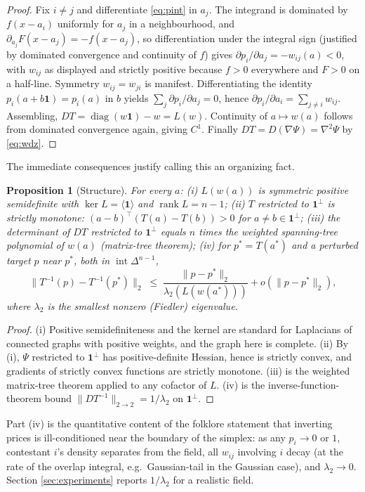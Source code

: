 \documentclass[11pt]{article}
\newtheorem{proposition}{Proposition}
\theoremstyle{definition}
\theoremstyle{remark}
\newcommand{\one}{\mathbf{1}}
\newcommand{\intsimplex}{\operatorname{int}\Delta^{n-1}}
\newcommand{\perpone}{\one^{\perp}}
\DeclareMathOperator{\diag}{diag}
\DeclareMathOperator{\rank}{rank}
\begin{document}
\begin{proof}
Fix $i \ne j$ and differentiate \eqref{eq:pint} in $a_j$.  The integrand is
dominated by $f(x-a_i)$ uniformly for $a_j$ in a neighbourhood, and
$\partial_{a_j} F(x-a_j) = -f(x-a_j)$, so differentiation under the integral
sign (justified by dominated convergence and continuity of $f$) gives
$\partial p_i / \partial a_j = -w_{ij}(a) < 0$, with $w_{ij}$ as displayed and
strictly positive because $f > 0$ everywhere and $F > 0$ on a half-line.
Symmetry $w_{ij} = w_{ji}$ is manifest.  Differentiating the identity
$p_i(a + b\one) = p_i(a)$ in $b$ yields
$\sum_j \partial p_i/\partial a_j = 0$, hence
$\partial p_i / \partial a_i = \sum_{j\ne i} w_{ij}$.  Assembling,
$DT = \diag(w\one) - w = L(w)$.  Continuity of $a \mapsto w(a)$ follows from
dominated convergence again, giving $C^1$.  Finally
$DT = D(\nabla\Psi) = \nabla^2\Psi$ by \eqref{eq:wdz}.
\end{proof}

The immediate consequences justify calling this an organizing fact.

\begin{proposition}[Structure]
\label{prop:structure}
For every $a$: (i) $L(w(a))$ is symmetric positive semidefinite with
$\ker L = \langle \one \rangle$ and $\rank L = n-1$; (ii) $T$ restricted to
$\perpone$ is strictly monotone:
$(a-b)^\top (T(a) - T(b)) > 0$ for $a \ne b \in \perpone$; (iii) the
determinant of $DT$ restricted to $\perpone$ equals $n$ times the weighted
spanning-tree polynomial of $w(a)$ (matrix-tree theorem); (iv) for
$p^* = T(a^*)$ and a perturbed target $p$ near $p^*$, both in
$\intsimplex$,
\[
  \| T^{-1}(p) - T^{-1}(p^*) \|_2 \;\le\; \frac{\|p - p^*\|_2}{\lambda_2(L(w(a^*)))}
  + o(\|p - p^*\|_2),
\]
where $\lambda_2$ is the smallest nonzero (Fiedler) eigenvalue.
\end{proposition}

\begin{proof}
(i) Positive semidefiniteness and the kernel are standard for Laplacians of
connected graphs with positive weights, and the graph here is complete.
(ii) By (i), $\Psi$ restricted to $\perpone$ has positive-definite Hessian,
hence is strictly convex, and gradients of strictly convex functions are
strictly monotone.  (iii) is the weighted matrix-tree theorem applied to any
cofactor of $L$.  (iv) is the inverse-function-theorem bound
$\|DT^{-1}\|_{2 \to 2} = 1/\lambda_2$ on $\perpone$.
\end{proof}

Part (iv) is the quantitative content of the folklore statement that
inverting prices is ill-conditioned near the boundary of the simplex: as any
$p_i \to 0$ or $1$, contestant $i$'s density separates from the field, all
$w_{ij}$ involving $i$ decay (at the rate of the overlap integral, e.g.\
Gaussian-tail in the Gaussian case), and $\lambda_2 \to 0$.  Section
\ref{sec:experiments} reports $1/\lambda_2$ for a realistic field.
\end{document}
